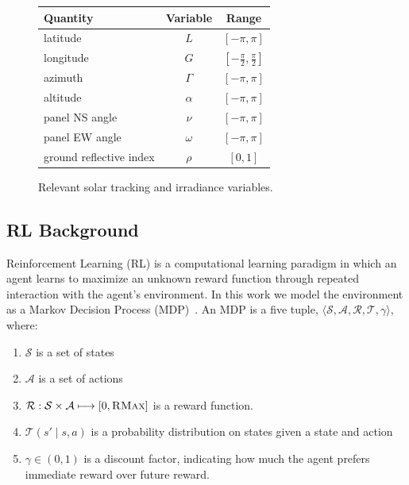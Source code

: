 \documentclass{article}
\newcommand{\mc}{\mathcal}
\begin{document}
{\renewcommand{\arraystretch}{1.2}%
\begin{figure}
\centering
\begin{tabular}{lcc}
\toprule
Quantity& Variable& Range \\
\midrule
latitude& $L$& $[-\pi, \pi]$ \\
longitude& $G$&  $\left[-\frac{\pi}{2}, \frac{\pi}{2}\right]$\\
azimuth& $\Gamma$& $[-\pi, \pi]$ \\
altitude& $\alpha$& $[-\pi, \pi]$ \\
panel NS angle& $\nu$& $[-\pi, \pi]$ \\
panel EW angle& $\omega$& $[-\pi, \pi]$ \\
ground reflective index& $\rho$& $[0,1]$ \\
\bottomrule
\end{tabular}
\caption{Relevant solar tracking and irradiance variables.}
\end{figure}

\subsection{RL Background}

Reinforcement Learning (RL) is a computational learning paradigm in which an agent learns to maximize an unknown reward function through repeated interaction with the agent's environment. In this work we model the environment as a Markov Decision Process (MDP)~\cite{puterman2014markov}. An MDP is a five tuple, $\langle \mc{S}, \mc{A}, \mc{R}, \mc{T}, \gamma \rangle$, where:
\begin{enumerate}
\item $\mc{S}$ is a set of states
\item $\mc{A}$ is a set of actions
\item $\mc{R} : \mc{S} \times \mc{A} \longmapsto [0,\textsc{RMax}] $ is a reward function.
\item $\mc{T}(s' \mid s,a)$ is a probability distribution on states given a state and action
\item $\gamma \in (0,1)$ is a discount factor, indicating how much the agent prefers immediate reward over future reward.
\end{enumerate}

}
\end{document}
